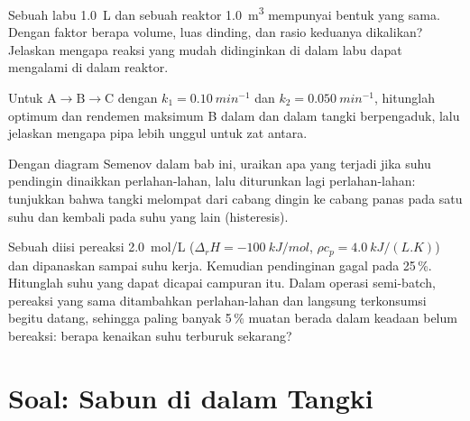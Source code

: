 \begin{exercise}[$\star\star$]\label{exo:b2:continuous-reactors:9}
Sebuah labu \qty{1.0}{L} dan sebuah reaktor \qty{1.0}{m^3} mempunyai bentuk
yang sama. Dengan faktor berapa volume, luas dinding, dan rasio keduanya
dikalikan? Jelaskan mengapa reaksi yang mudah didinginkan di dalam labu
dapat mengalami  di dalam reaktor.
\end{exercise}

\begin{exercise}[$\star\star\star$]\label{exo:b2:continuous-reactors:10}
Untuk $\mathrm A \to \mathrm B \to \mathrm C$ dengan $k_1 = \qty{0.10}{min^{-1}}$
dan $k_2 = \qty{0.050}{min^{-1}}$, hitunglah  optimum dan
rendemen maksimum B dalam  dan dalam tangki
berpengaduk, lalu jelaskan mengapa pipa lebih unggul untuk zat antara.
\end{exercise}

\begin{exercise}[$\star\star\star$]\label{exo:b2:continuous-reactors:11}
Dengan diagram Semenov dalam bab ini, uraikan apa yang terjadi jika suhu
pendingin dinaikkan perlahan-lahan, lalu diturunkan lagi perlahan-lahan:
tunjukkan bahwa tangki melompat dari cabang dingin ke cabang panas pada
satu suhu dan kembali pada suhu yang lain (histeresis).
\end{exercise}

\begin{exercise}[$\star\star\star$]\label{exo:b2:continuous-reactors:12}
Sebuah  diisi pereaksi \qty{2.0}{mol/L} ($\Delta_r H =
\qty{-100}{kJ/mol}$, $\rho c_p = \qty{4.0}{kJ/(L.K)}$) dan dipanaskan sampai
suhu kerja. Kemudian pendinginan gagal pada  25\,\%. Hitunglah
suhu yang dapat dicapai campuran itu. Dalam operasi semi-batch, pereaksi
yang sama ditambahkan perlahan-lahan dan langsung terkonsumsi begitu
datang, sehingga paling banyak 5\,\% muatan berada dalam keadaan belum
bereaksi: berapa kenaikan suhu terburuk sekarang?
\end{exercise}

\section{Soal: Sabun di dalam Tangki}

